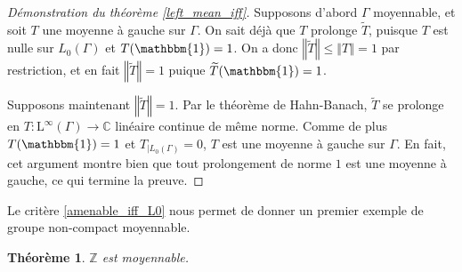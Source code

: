\documentclass[a4paper,12pt]{article}
\newtheorem{theorem}{Théorème}[section]
\newcommand{\Z}{\mathbb{Z}}
\newcommand{\C}{\mathbb{C}}
\newcommand{\norm}[1]{\left\Vert #1\right\Vert}
\newcommand{\indic}{\mathbbm{1}}
\begin{document}
\begin{proof}[Démonstration du théorème \ref{left_mean_iff}]
    Supposons d'abord $\Gamma$ moyennable, et soit $T$ une moyenne à gauche sur $\Gamma$.
    On sait déjà que $T$ prolonge $\widetilde{T}$, puisque $T$ est nulle sur $L_0(\Gamma)$ et 
    $T(\indic)=1$. On a donc $\norm{\widetilde{T}}\le\norm{T}=1$ par restriction, et en fait $\norm{\widetilde{T}} = 1$
    puique $\widetilde{T}(\indic)=1$. 

    Supposons maintenant $\norm{\widetilde{T}}=1$. Par le théorème de Hahn-Banach, $\widetilde{T}$ se prolonge 
    en $T:\mathrm{L}^\infty(\Gamma)\to\C$ linéaire continue de même norme. Comme de plus $T(\indic)=1$ et 
    $T_{|L_0(\Gamma)} = 0$, $T$ est une moyenne à gauche sur $\Gamma$. En fait, cet argument montre bien 
    que tout prolongement de norme $1$ est une moyenne à gauche, ce qui termine la preuve.
\end{proof}

Le critère \ref{amenable_iff_L0} nous permet de donner un premier exemple de groupe non-compact moyennable.

\begin{theorem}\label{Z_amenable}
    $\Z$ est moyennable.
\end{theorem}
\end{document}
